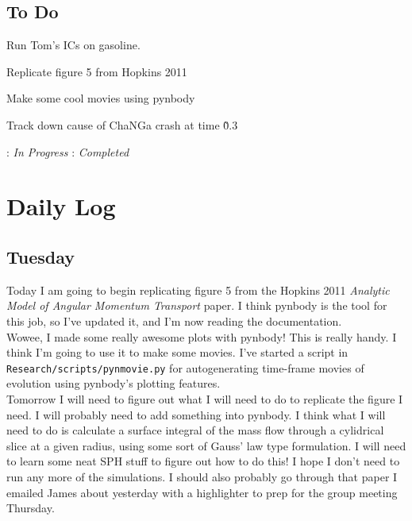 \documentclass[11pt,letterpaper]{article}
\begin{document}
\subsection*{To Do}
\begin{bullets}
\item[\checkmark] Run Tom's ICs on gasoline.
\item[\textleaf] Replicate figure 5 from Hopkins 2011
\item[\checkmark] Make some cool movies using pynbody
\item Track down cause of ChaNGa crash at time \~0.3
\end{bullets}

\textleaf : \textit{In Progress} \qquad \checkmark : \textit{Completed}

\section*{Daily Log}
\subsection*{Tuesday}
Today I am going to begin replicating figure 5 from the Hopkins 2011 \textit{
Analytic Model of Angular Momentum Transport} paper.  I think pynbody is the
tool for this job, so I've updated it, and I'm now reading the documentation.\\
Wowee, I made some really awesome plots with pynbody!  This is really handy.  
I think I'm going to use it to make some movies. I've started a script in 
\verb!Research/scripts/pynmovie.py! for autogenerating time-frame movies of 
evolution using pynbody's plotting features.\\
Tomorrow I will need to figure out what I will need to do to replicate the 
figure I need.  I will probably need to add something into pynbody.  I think 
what I will need to do is calculate a surface integral of the mass flow through
a cylidrical slice at a given radius, using some sort of Gauss' law type 
formulation.  I will need to learn some neat SPH stuff to figure out how to do
this! I hope I don't need to run any more of the simulations.  I should also 
probably go through that paper I emailed James about yesterday with a 
highlighter to prep for the group meeting Thursday.
\end{document}

